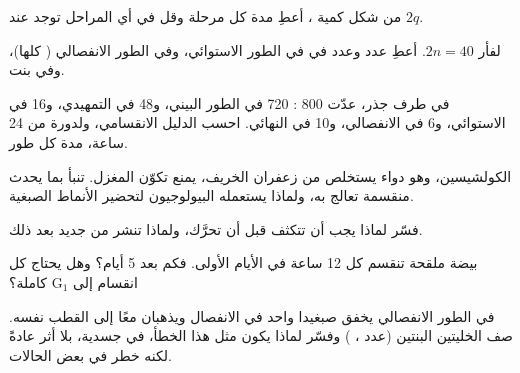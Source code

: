 \begin{exercise}[$\star\star$]\label{exo:g11:cell-cycle-mitosis:6}
من شكل كمية ، أعطِ مدة كل مرحلة وقل في أي المراحل توجد  عند
$2q$.
\end{exercise}

\begin{exercise}[$\star\star$]\label{exo:g11:cell-cycle-mitosis:7}
لفأر $2n = 40$. أعطِ عدد  وعدد  في  في الطور
الاستوائي، وفي الطور الانفصالي ( كلها)، وفي  بنت.
\end{exercise}

\begin{exercise}[$\star\star$]\label{exo:g11:cell-cycle-mitosis:8}
في طرف جذر، عدّت 800 : 720 في الطور البيني، و48 في التمهيدي، و16
في الاستوائي، و6 في الانفصالي، و10 في النهائي. احسب الدليل الانقسامي،
ولدورة من 24 ساعة، مدة كل طور.
\end{exercise}

\begin{exercise}[$\star\star$]\label{exo:g11:cell-cycle-mitosis:9}
الكولشيسين، وهو دواء يستخلص من زعفران الخريف، يمنع تكوّن المغزل. تنبأ
بما يحدث  منقسمة تعالج به، ولماذا يستعمله البيولوجيون لتحضير
الأنماط الصبغية.
\end{exercise}

\begin{exercise}[$\star\star$]\label{exo:g11:cell-cycle-mitosis:10}
فسّر لماذا يجب أن تتكثف  قبل أن تحرَّك، ولماذا تنشر من جديد
بعد ذلك.
\end{exercise}

\begin{exercise}[$\star\star$]\label{exo:g11:cell-cycle-mitosis:11}
بيضة ملقحة تنقسم كل 12 ساعة في الأيام الأولى. فكم  بعد 5 أيام؟
وهل يحتاج كل انقسام إلى $\mathrm{G_1}$ كاملة؟
\end{exercise}

\begin{exercise}[$\star\star\star$]\label{exo:g11:cell-cycle-mitosis:12}
في الطور الانفصالي يخفق صبغيدا  واحد في الانفصال ويذهبان معًا إلى
القطب نفسه. صف الخليتين البنتين (عدد ، ) وفسّر لماذا يكون
مثل هذا الخطأ، في  جسدية، بلا أثر عادةً لكنه خطر في بعض الحالات.
\end{exercise}

